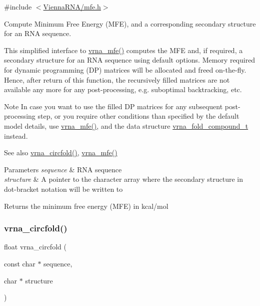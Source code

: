 {\ttfamily \#include $<$\mbox{\hyperlink{mfe_8h}{Vienna\+R\+N\+A/mfe.\+h}}$>$}



Compute Minimum Free Energy (M\+FE), and a corresponding secondary structure for an R\+NA sequence. 

This simplified interface to \mbox{\hyperlink{group__mfe__global_gabd3b147371ccf25c577f88bbbaf159fd}{vrna\+\_\+mfe()}} computes the M\+FE and, if required, a secondary structure for an R\+NA sequence using default options. Memory required for dynamic programming (DP) matrices will be allocated and free\textquotesingle{}d on-\/the-\/fly. Hence, after return of this function, the recursively filled matrices are not available any more for any post-\/processing, e.\+g. suboptimal backtracking, etc.

\begin{DoxyNote}{Note}
In case you want to use the filled DP matrices for any subsequent post-\/processing step, or you require other conditions than specified by the default model details, use \mbox{\hyperlink{group__mfe__global_gabd3b147371ccf25c577f88bbbaf159fd}{vrna\+\_\+mfe()}}, and the data structure \mbox{\hyperlink{group__fold__compound_ga1b0cef17fd40466cef5968eaeeff6166}{vrna\+\_\+fold\+\_\+compound\+\_\+t}} instead.
\end{DoxyNote}
\begin{DoxySeeAlso}{See also}
\mbox{\hyperlink{group__mfe__global_gaf973483d8acbc8cc9aacfc8a9b7f0074}{vrna\+\_\+circfold()}}, \mbox{\hyperlink{group__mfe__global_gabd3b147371ccf25c577f88bbbaf159fd}{vrna\+\_\+mfe()}}
\end{DoxySeeAlso}

\begin{DoxyParams}{Parameters}
{\em sequence} & R\+NA sequence \\
\hline
{\em structure} & A pointer to the character array where the secondary structure in dot-\/bracket notation will be written to \\
\hline
\end{DoxyParams}
\begin{DoxyReturn}{Returns}
the minimum free energy (M\+FE) in kcal/mol 
\end{DoxyReturn}
\mbox{\label{group__mfe__global_gaf973483d8acbc8cc9aacfc8a9b7f0074}} 
\subsubsection{\texorpdfstring{vrna\_circfold()}{vrna\_circfold()}}
{\footnotesize\ttfamily float vrna\+\_\+circfold (\begin{DoxyParamCaption}\item[{const char $\ast$}]{sequence,  }\item[{char $\ast$}]{structure }\end{DoxyParamCaption})}



